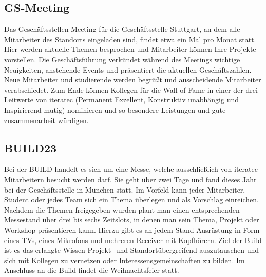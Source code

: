 \subsection{GS-Meeting}
Das Geschäftsstellen-Meeting für die Geschäftsstelle Stuttgart, an dem alle Mitarbeiter des Standorts eingeladen sind,
findet etwa ein Mal pro Monat statt. Hier werden aktuelle Themen besprochen und Mitarbeiter können Ihre Projekte
vorstellen. Die Geschäftsführung verkündet während des Meetings wichtige Neuigkeiten, anstehende Events und präsentiert
die aktuellen Geschäftszahlen. Neue Mitarbeiter und studierende werden begrüßt und ausscheidende Mitarbeiter
verabschiedet. Zum Ende können Kollegen für die Wall of Fame in einer der drei Leitwerte von iteratec (Permanent
Exzellent, Konstruktiv unabhängig und Inspirierend mutig) nominieren und so besondere Leistungen und gute zusammenarbeit
würdigen.

\subsection{BUILD23}
Bei der BUILD handelt es sich um eine Messe, welche ausschließlich von iteratec Mitarbeitern besucht werden darf. Sie
geht über zwei Tage und fand dieses Jahr bei der Geschäftsstelle in München statt. Im Vorfeld kann jeder Mitarbeiter,
Student oder jedes Team sich ein Thema überlegen und als Vorschlag einreichen. Nachdem die Themen freigegeben wurden
plant man einen entsprechenden Messestand über drei bis sechs Zeitslots, in denen man sein Thema, Projekt oder Workshop
präsentieren kann. Hierzu gibt es an jedem Stand Ausrüstung in Form eines TVs, eines Mikrofons und mehreren Receiver
mit Kopfhörern. Ziel der Build ist es das erlangte Wissen Projekt- und Standortübergreifend auszutauschen und sich mit
Kollegen zu vernetzen oder Interessensgemeinschaften zu bilden. Im Anschluss an die Build findet die Weihnachtsfeier
statt.

%

